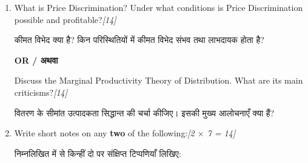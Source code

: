 \documentclass[11pt,a4paper]{article}
\newcommand{\pts}[1]{\hfill \textit{[#1]}}
\begin{document}
\begin{enumerate}[label=\textbf{\arabic*.},leftmargin=*,itemsep=14pt]
  Discuss the main features of Monopoly. How are price and output determined under Monopoly?\pts{14}
  
  एकाधिकार की मुख्य विशेषताओं की चर्चा कीजिए। एकाधिकार के अंतर्गत कीमत तथा उत्पादन का निर्धारण किस प्रकार होता है?

  \item What is Price Discrimination? Under what conditions is Price Discrimination possible and profitable?\pts{14}
  
  कीमत विभेद क्या है? किन परिस्थितियों में कीमत विभेद संभव तथा लाभदायक होता है?

  \begin{center}\textbf{OR / अथवा}\end{center}

  Discuss the Marginal Productivity Theory of Distribution. What are its main criticisms?\pts{14}
  
  वितरण के सीमांत उत्पादकता सिद्धान्त की चर्चा कीजिए। इसकी मुख्य आलोचनाएँ क्या हैं?

  \item Write short notes on any \textbf{two} of the following:\pts{2 $\times$ 7 = 14}
  
  निम्नलिखित में से किन्हीं दो पर संक्षिप्त टिप्पणियाँ लिखिए:

\end{enumerate}
\end{document}
